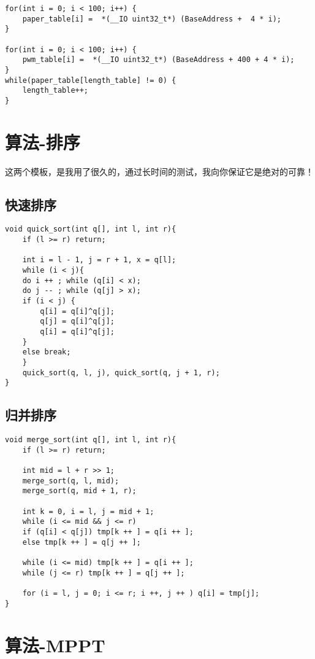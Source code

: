 \documentclass[cn,11pt]{elegantbook}
\begin{document}
\begin{lstlisting}
for(int i = 0; i < 100; i++) {
	paper_table[i] =  *(__IO uint32_t*) (BaseAddress +  4 * i);
}

for(int i = 0; i < 100; i++) {
	pwm_table[i] =  *(__IO uint32_t*) (BaseAddress + 400 + 4 * i);
}
while(paper_table[length_table] != 0) {
	length_table++;
}
\end{lstlisting}

\section{算法-排序}

这两个模板，是我用了很久的，通过长时间的测试，我向你保证它是绝对的可靠！



\subsection{快速排序}

\lstset{language=C}
\begin{lstlisting}
void quick_sort(int q[], int l, int r){
	if (l >= r) return;
	
	int i = l - 1, j = r + 1, x = q[l];
	while (i < j){
	do i ++ ; while (q[i] < x);
	do j -- ; while (q[j] > x);
	if (i < j) {
		q[i] = q[i]^q[j];
		q[j] = q[i]^q[j];
		q[i] = q[i]^q[j];
	}
	else break;
	}
	quick_sort(q, l, j), quick_sort(q, j + 1, r);
}
\end{lstlisting}

\subsection{归并排序}

\lstset{language=C}
\begin{lstlisting}
void merge_sort(int q[], int l, int r){
	if (l >= r) return;
	
	int mid = l + r >> 1;
	merge_sort(q, l, mid);
	merge_sort(q, mid + 1, r);
	
	int k = 0, i = l, j = mid + 1;
	while (i <= mid && j <= r)
	if (q[i] < q[j]) tmp[k ++ ] = q[i ++ ];
	else tmp[k ++ ] = q[j ++ ];
	
	while (i <= mid) tmp[k ++ ] = q[i ++ ];
	while (j <= r) tmp[k ++ ] = q[j ++ ];
	
	for (i = l, j = 0; i <= r; i ++, j ++ ) q[i] = tmp[j];
}
\end{lstlisting}
\section{算法-MPPT}
\end{document}
